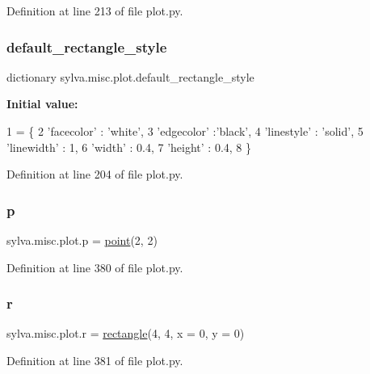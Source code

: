 Definition at line 213 of file plot.\+py.

\mbox{\label{namespacesylva_1_1misc_1_1plot_a9d341463b25190ccc0193e07c697648f}} 
\subsubsection{\texorpdfstring{default\+\_\+rectangle\+\_\+style}{default\_rectangle\_style}}
{\footnotesize\ttfamily dictionary sylva.\+misc.\+plot.\+default\+\_\+rectangle\+\_\+style}

{\bfseries Initial value\+:}
\begin{DoxyCode}
1 =  \{
2     \textcolor{stringliteral}{'facecolor'} : \textcolor{stringliteral}{'white'},
3     \textcolor{stringliteral}{'edgecolor'} :\textcolor{stringliteral}{'black'},
4     \textcolor{stringliteral}{'linestyle'} : \textcolor{stringliteral}{'solid'},
5     \textcolor{stringliteral}{'linewidth'} : 1,
6     \textcolor{stringliteral}{'width'} : 0.4,
7     \textcolor{stringliteral}{'height'} : 0.4,
8     \}
\end{DoxyCode}


Definition at line 204 of file plot.\+py.

\mbox{\label{namespacesylva_1_1misc_1_1plot_a0cda7def12ec7fe347a18675bc3f3ead}} 
\subsubsection{\texorpdfstring{p}{p}}
{\footnotesize\ttfamily sylva.\+misc.\+plot.\+p = \hyperlink{classsylva_1_1misc_1_1plot_1_1point}{point}(2, 2)}



Definition at line 380 of file plot.\+py.

\mbox{\label{namespacesylva_1_1misc_1_1plot_a620aa90142604ebb167426bcbd31acb1}} 
\subsubsection{\texorpdfstring{r}{r}}
{\footnotesize\ttfamily sylva.\+misc.\+plot.\+r = \hyperlink{classsylva_1_1misc_1_1plot_1_1rectangle}{rectangle}(4, 4, x = 0, y = 0)}



Definition at line 381 of file plot.\+py.

